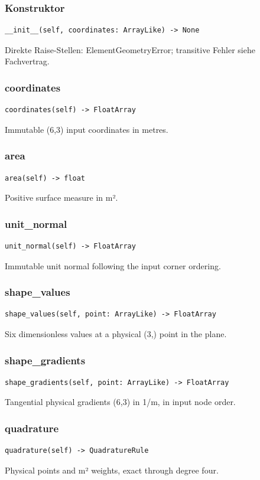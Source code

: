 \subsubsection*{Konstruktor}
\begin{lstlisting}
__init__(self, coordinates: ArrayLike) -> None
\end{lstlisting}
Direkte Raise-Stellen: ElementGeometryError; transitive Fehler siehe Fachvertrag.
\subsubsection*{coordinates}
\begin{lstlisting}
coordinates(self) -> FloatArray
\end{lstlisting}
Immutable (6,3) input coordinates in metres.
\subsubsection*{area}
\begin{lstlisting}
area(self) -> float
\end{lstlisting}
Positive surface measure in m².
\subsubsection*{unit\_normal}
\begin{lstlisting}
unit_normal(self) -> FloatArray
\end{lstlisting}
Immutable unit normal following the input corner ordering.
\subsubsection*{shape\_values}
\begin{lstlisting}
shape_values(self, point: ArrayLike) -> FloatArray
\end{lstlisting}
Six dimensionless values at a physical (3,) point in the plane.
\subsubsection*{shape\_gradients}
\begin{lstlisting}
shape_gradients(self, point: ArrayLike) -> FloatArray
\end{lstlisting}
Tangential physical gradients (6,3) in 1/m, in input node order.
\subsubsection*{quadrature}
\begin{lstlisting}
quadrature(self) -> QuadratureRule
\end{lstlisting}
Physical points and m² weights, exact through degree four.
